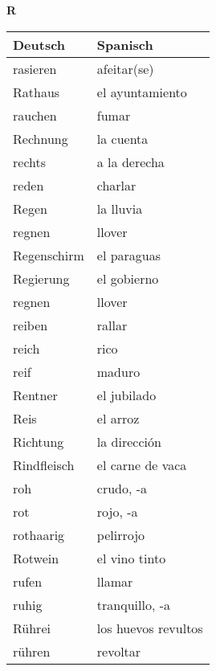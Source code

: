 \begin{flushright}\begin{Huge}\textbf{R}\end{Huge}\end{flushright}

\begin{longtable}{p{} p{}} 
\textbf{Deutsch}     & \textbf{Spanisch}                                       \\ \hline
\hline
\endhead %
rasieren & afeitar(se)\\
Rathaus & el ayuntamiento\\
rauchen & fumar\\
Rechnung & la cuenta\\
rechts & a la derecha\\
reden & charlar\\
Regen & la lluvia\\
regnen & llover\\
Regenschirm & el paraguas\\
Regierung & el gobierno\\
regnen & llover\\
reiben & rallar\\
reich & rico\\
reif & maduro\\
Rentner & el jubilado \\
Reis & el arroz\\
Richtung & la dirección\\
Rindfleisch & el carne de vaca\\
roh & crudo, -a\\
rot & rojo, -a\\
rothaarig & pelirrojo\\
Rotwein & el vino tinto \\
rufen & llamar \\
ruhig & tranquillo, -a\\
Rührei & los huevos revultos\\
rühren & revoltar\\

\end{longtable}
